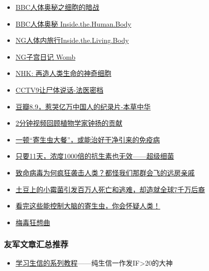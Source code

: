 \documentclass[]{article}
\providecommand{\tightlist}{%
  \setlength{\itemsep}{0pt}\setlength{\parskip}{0pt}}
\numberwithin{figure}{section}
\numberwithin{table}{section}
\begin{document}
\begin{itemize}
\tightlist
\item
  \href{http://mp.weixin.qq.com/s/M35ebWAelDIK5Iqib06JzA}{BBC人体奥秘之细胞的暗战}
\item
  \href{https://mp.weixin.qq.com/s/xlCdN8il1hcutkYK-42fAQ}{BBC人体奥秘 Inside.the.Human.Body}
\item
  \href{http://mp.weixin.qq.com/s/xqgolgPlRDYQDkDiWu8zOA}{NG人体内旅行Inside.the.Living.Body}
\item
  \href{http://mp.weixin.qq.com/s/XZ5yNW56Bf4NFkcbuxgQYw}{NG子宫日记 Womb}\\
\item
  \href{https://mp.weixin.qq.com/s/IHN4O5xk6ySV5EC8QpBjDw}{NHK: 再造人类生命的神奇细胞}
\item
  \href{http://mp.weixin.qq.com/s/sHTTd_Rb7XibV4CoCVzcAQ}{CCTV9让尸体说话-法医密档}
\item
  \href{http://mp.weixin.qq.com/s/nR2EiQYcEYH3VeR3RDlT5w}{豆瓣8.9，惹哭亿万中国人的纪录片-本草中华}
\item
  \href{http://mp.weixin.qq.com/s/qul0uhcLY3xS4Dyxbd7GaA}{2分钟视频回顾植物学家钟扬的贡献}
\item
  \href{https://mp.weixin.qq.com/s/hX0K9TOLPnrZ6f8lUoSYag}{一顿``寄生虫大餐''，或能治好干净引来的免疫病}
\item
  \href{http://mp.weixin.qq.com/s/SXmXlu7XFnO9fIgejSWdtA}{只要11天，浓度1000倍的抗生素也无效------超级细菌}
\item
  \href{http://mp.weixin.qq.com/s/CAh-hYRCfvQbyDeh6xlyYA}{致命病毒为何疯狂袭击人类？都怪我们那群会飞的远房亲戚}
\item
  \href{http://mp.weixin.qq.com/s/jv2ZKWqDTB_IyLeMImHvDw}{土豆上的小霉菌引发百万人死亡和逃难，却造就全球7千万后裔}
\item
  \href{http://mp.weixin.qq.com/s/P2od51617RZGxrmLBMSKZw}{看完这些能控制大脑的寄生虫，你会怀疑人类！}
\item
  \href{http://mp.weixin.qq.com/s/XfeuKLLg3ruXUCFnFAisog}{梅毒狂想曲}
\end{itemize}

\hypertarget{ux53cbux519bux6587ux7ae0ux6c47ux603bux63a8ux8350}{%
\subsubsection{友军文章汇总推荐}\label{ux53cbux519bux6587ux7ae0ux6c47ux603bux63a8ux8350}}

\begin{itemize}
\tightlist
\item
  \href{https://mp.weixin.qq.com/s/VguRtaGpEcaNzmZEi48gLg}{学习生信的系列教程}------纯生信一作发IF\textgreater20的大神
\end{itemize}
\end{document}
